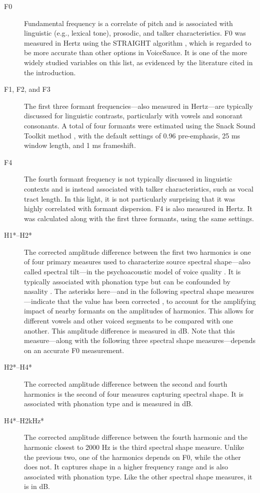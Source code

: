 \begin{description}
    \item[F0] Fundamental frequency is a correlate of pitch and is associated with linguistic (e.g., lexical tone), prosodic, and talker characteristics. F0 was measured in Hertz using the STRAIGHT algorithm \citep{kawahara_2016_straight}, which is regarded to be more accurate than other options in VoiceSauce. It is one of the more widely studied variables on this list, as evidenced by the literature cited in the introduction.
    \item[F1, F2, and F3] The first three formant frequencies---also measured in Hertz---are typically discussed for linguistic contrasts, particularly with vowels and sonorant consonants. A total of four formants were estimated using the Snack Sound Toolkit method \cite{sjolander_2004_snack}, with the default settings of 0.96 pre-emphasis, 25 ms window length, and 1 ms frameshift.
    \item[F4] The fourth formant frequency is not typically discussed in linguistic contexts and is instead associated with talker characteristics, such as vocal tract length. In this light, it is not particularly surprising that it was highly correlated with formant dispersion. F4 is also measured in Hertz. It was calculated along with the first three formants, using the same settings.
    \item[H1*--H2*] The corrected amplitude difference between the first two harmonics is one of four primary measures used to characterize source spectral shape---also called spectral tilt---in the psychoacoustic model of voice quality \citep{kreiman_2014_theory}. It is typically associated with phonation type but can be confounded by nasality \citep{garellek_2019_voice,munson_2019_phonetics}. The asterisks here---and in the following spectral shape measures---indicate that the value has been corrected \citep{iseli_2007_voice}, to account for the amplifying impact of nearby formants on the amplitudes of harmonics. This allows for different vowels and other voiced segments to be compared with one another. This amplitude difference is measured in dB. Note that this measure---along with the following three spectral shape measures---depends on an accurate F0 measurement.
    \item[H2*--H4*] The corrected amplitude difference between the second and fourth harmonics is the second of four measures capturing spectral shape. It is associated with phonation type and is measured in dB.
    \item[H4*--H2kHz*] The corrected amplitude difference between the fourth harmonic and the harmonic closest to 2000 Hz is the third spectral shape measure. Unlike the previous two, one of the harmonics depends on F0, while the other does not. It captures shape in a higher frequency range and is also associated with phonation type. Like the other spectral shape measures, it is in dB.

\end{description}
